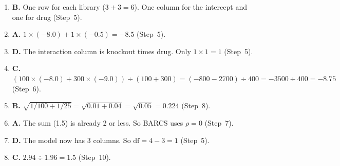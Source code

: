 \documentclass[12pt]{article}
\begin{document}
\begin{enumerate}[label=\textbf{Q\arabic*.},leftmargin=2.6em,itemsep=6pt]
\item \textbf{B.} One row for each library ($3 + 3 = 6$). One column for the
  intercept and one for drug (Step~5).
\item \textbf{A.} $1 \times (-8.0) + 1 \times (-0.5) = -8.5$ (Step~5).
\item \textbf{D.} The interaction column is knockout times drug. Only
  $1 \times 1 = 1$ (Step~5).
\item \textbf{C.} $(100 \times (-8.0) + 300 \times (-9.0)) \div (100 + 300)
  = (-800 - 2700) \div 400 = -3500 \div 400 = -8.75$ (Step~6).
\item \textbf{B.} $\sqrt{1/100 + 1/25} = \sqrt{0.01 + 0.04} = \sqrt{0.05}
  = 0.224$ (Step~8).
\item \textbf{A.} The sum (1.5) is already 2 or less. So BARCS uses
  $\rho = 0$ (Step~7).
\item \textbf{D.} The model now has 3 columns. So
  $\text{df} = 4 - 3 = 1$ (Step~5).
\item \textbf{C.} $2.94 \div 1.96 = 1.5$ (Step~10).
\end{enumerate}
\end{document}
